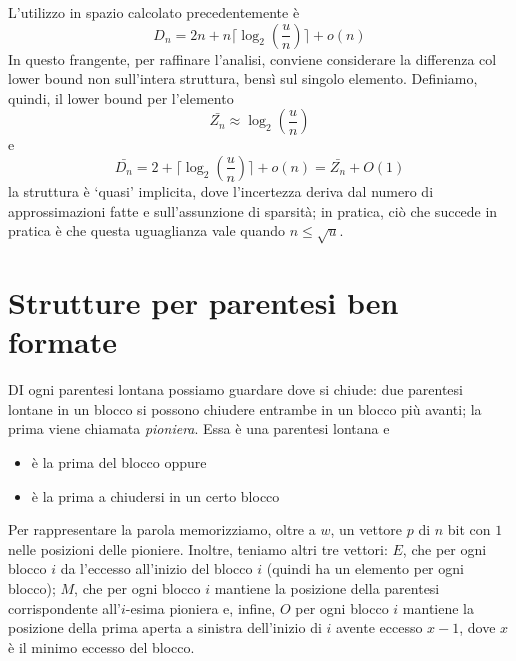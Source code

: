 L'utilizzo in spazio calcolato precedentemente è 
$$
D_n = 2n + n \lceil \log_2(\frac{u}{n}) \rceil + o(n)
$$
In questo frangente, per raffinare l'analisi, conviene considerare la differenza 
col lower bound non sull'intera struttura, bensì sul singolo elemento. 
Definiamo, quindi, il lower bound per l'elemento
$$
\bar{Z_n} \approx \log_2(\frac{u}{n})
$$
e 
$$
\bar{D_n} = 2+ \lceil \log_2(\frac{u}{n}) \rceil + o(n) = \bar{Z_n} + O(1)
$$
la struttura è `quasi' implicita, dove l'incertezza deriva dal numero di 
approssimazioni fatte e sull'assunzione di sparsità; in pratica, ciò che succede 
in pratica è che questa uguaglianza vale quando $n \leq \sqrt{u}$.

\section{Strutture per parentesi ben formate}

DI ogni parentesi lontana possiamo guardare dove si chiude: due parentesi lontane in un blocco
si possono chiudere entrambe in un blocco più avanti; la prima viene chiamata \textit{pioniera}.
Essa è una parentesi lontana e
\begin{itemize}
	\item è la prima del blocco oppure
	\item è la prima a chiudersi in un certo blocco
\end{itemize}
Per rappresentare la parola memorizziamo, oltre a $w$, un vettore $p$ di $n$ bit con $1$ nelle posizioni
delle pioniere. Inoltre, teniamo altri tre vettori: $E$, che per ogni blocco $i$ da l'eccesso all'inizio
del blocco $i$ (quindi ha un elemento per ogni blocco); $M$, che per ogni blocco $i$ mantiene la posizione
della parentesi corrispondente all'$i$-esima pioniera e, infine, $O$ per ogni blocco $i$ mantiene la
posizione della prima aperta a sinistra dell'inizio di $i$ avente eccesso $x-1$, dove $x$ è il
minimo eccesso del blocco.

